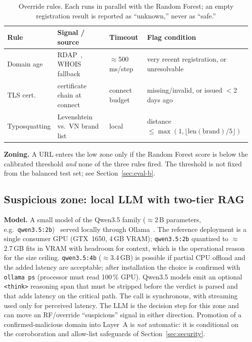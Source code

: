 \documentclass[conference]{IEEEtran}
\begin{document}
\begin{table}[t]
\centering
\caption{Override rules. Each runs in parallel with the Random Forest; an empty
registration result is reported as ``unknown,'' never as ``safe.''}
\label{tab:override}
\footnotesize
\begin{tabular}{@{}p{}p{}p{}p{}@{}}
\toprule
Rule & Signal / source & Timeout & Flag condition \\
\midrule
Domain age & RDAP~\cite{rfc9082,rfc9083,rfc9224}, WHOIS fallback & $\approx$500\,ms/step & very recent registration, or unresolvable \\
TLS cert.\ & certificate chain at connect & connect budget & missing/invalid, or issued $<$2 days ago \\
Typosquatting & Levenshtein~\cite{levenshtein1966} vs.\ VN brand list & local & distance $\le \max(1,\lfloor \mathrm{len(brand)}/5 \rfloor)$ \\
\bottomrule
\end{tabular}
\end{table}

\textbf{Zoning.} A URL enters the low zone only if the Random Forest score is
below the calibrated threshold \emph{and} none of the three rules fired. The
threshold is not fixed from the balanced test set; see Section~\ref{sec:eval-b}.

\subsection{Suspicious zone: local LLM with two-tier RAG}
\label{sec:arch-d}
\textbf{Model.} A small model of the Qwen3.5 family ($\approx$2\,B parameters,
e.g.\ \texttt{qwen3.5:2b})~\cite{qwen35card,qwen3report} served locally through
Ollama~\cite{ollama}. The reference deployment is a single consumer GPU
(GTX~1650, 4\,GB VRAM); \texttt{qwen3.5:2b} quantized to $\approx$2.7\,GB fits in
VRAM with headroom for context, which is the operational reason for the size
ceiling. \texttt{qwen3.5:4b} ($\approx$3.4\,GB) is possible if partial CPU
offload and the added latency are acceptable; after installation the choice is
confirmed with \texttt{ollama ps} (processor must read 100\,\% GPU). Qwen3.5
models emit an optional \texttt{<think>} reasoning span that must be stripped
before the verdict is parsed and that adds latency on the critical path. The call is synchronous, with
streaming used only for perceived latency. The LLM is the decision step for this
zone and can move an RF/override ``suspicious'' signal in either direction.
Promotion of a confirmed-malicious domain into Layer~A is \emph{not} automatic:
it is conditional on the corroboration and allow-list safeguards of
Section~\ref{sec:security}.
\end{document}
